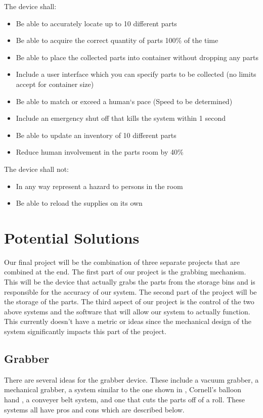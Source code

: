 \documentclass[12pt]{report}
\begin{document}

\noindent The device shall: \\
\begin{itemize}
\item Be able to accurately locate up to 10 different parts
\item Be able to acquire the correct quantity of parts 100\% of the time
\item Be able to place the collected parts into container without dropping any parts
\item Include a user interface which you can specify parts to be collected (no limits accept for container size)
\item Be able to match or exceed a human`s pace (Speed to be determined)
\item Include an emergency shut off that kills the system within 1 second
\item Be able to update an inventory of 10 different parts
\item Reduce human involvement in the parts room by 40\%
\end{itemize}


\noindent The device shall not: \\
\begin{itemize}
\item In any way represent a hazard to persons in the room
\item Be able to reload the supplies on its own
\end{itemize}

\section*{Potential Solutions}
Our final project will be the combination of three separate projects that are combined at the end. The first part of our project is the grabbing mechanism. This will be the device that actually grabs the parts from the storage bins and is responsible for the accuracy of our system. The second part of the project will be the storage of the parts. The third aspect of our project is the control of the two above systems and the software that will allow our system to actually function. This currently doesn't have a metric or ideas since the mechanical design of the system significantly impacts this part of the project.
\subsection*{Grabber}
There are several ideas for the grabber device. These include a vacuum grabber, a mechanical grabber, a system similar to the one shown in \cite{legoSorter}, Cornell's balloon hand \cite{universalGrabber}, a conveyer belt system, and one that cuts the parts off of a roll. These systems all have pros and cons which are described below.
\end{document}

